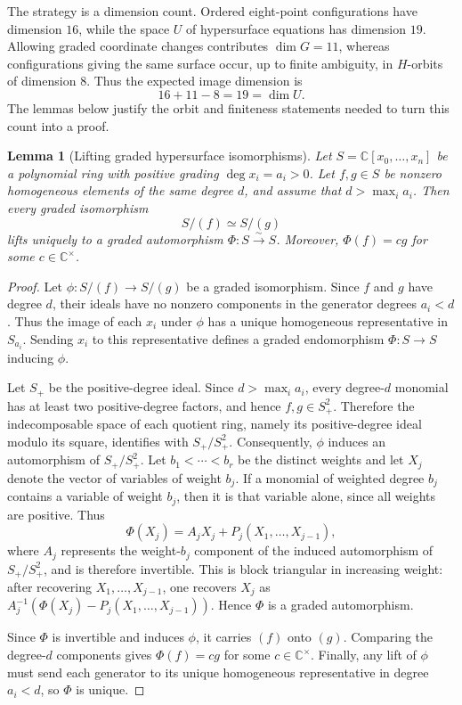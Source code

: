 \documentclass[11pt]{article}
\theoremstyle{plain}
\newtheorem{lemma}[lemma]{Lemma}
\theoremstyle{definition}
\theoremstyle{remark}
\newcommand{\C}{\mathbb C}
\begin{document}
The strategy is a dimension count. Ordered eight-point configurations have
dimension \(16\), while the space \(U\) of hypersurface equations has
dimension \(19\). Allowing graded coordinate changes contributes
\(\dim G=11\), whereas configurations giving the same surface occur, up to
finite ambiguity, in \(H\)-orbits of dimension \(8\). Thus the expected
image dimension is
\[
16+11-8=19=\dim U.
\]
The lemmas below justify the orbit and finiteness statements needed to turn
this count into a proof.

\begin{lemma}[Lifting graded hypersurface isomorphisms]
\label{lem:graded-ring-lift}
Let \(S=\C[x_0,\ldots,x_n]\) be a polynomial ring with positive grading
\(\deg x_i=a_i>0\). Let \(f,g\in S\) be nonzero homogeneous elements of
the same degree \(d\), and assume that \(d>\max_i a_i\). Then every graded
isomorphism
\[
S/(f)\simeq S/(g)
\]
lifts uniquely to a graded automorphism \(\Phi:S\xrightarrow{\sim}S\).
Moreover, \(\Phi(f)=cg\) for some \(c\in\C^\times\).
\end{lemma}

\begin{proof}
Let \(\phi:S/(f)\to S/(g)\) be a graded isomorphism. Since \(f\) and
\(g\) have degree \(d\), their ideals have no nonzero components in the
generator degrees \(a_i<d\). Thus the image of each \(x_i\) under \(\phi\)
has a unique homogeneous representative in \(S_{a_i}\). Sending \(x_i\) to
this representative defines a graded endomorphism \(\Phi:S\to S\) inducing
\(\phi\).

Let \(S_+\) be the positive-degree ideal. Since \(d>\max_i a_i\), every
degree-\(d\) monomial has at least two positive-degree factors, and hence
\(f,g\in S_+^2\). Therefore the indecomposable space of each quotient
ring, namely its positive-degree ideal modulo its square, identifies with
\(S_+/S_+^2\). Consequently, \(\phi\) induces an automorphism of
\(S_+/S_+^2\). Let \(b_1<\cdots<b_r\) be the distinct weights and let
\(X_j\) denote the vector of variables of weight \(b_j\). If a monomial of
weighted degree \(b_j\) contains a variable of weight \(b_j\), then it is
that variable alone, since all weights are positive. Thus
\[
\Phi(X_j)=A_jX_j+P_j(X_1,\ldots,X_{j-1}),
\]
where \(A_j\) represents the weight-\(b_j\) component of the induced
automorphism of \(S_+/S_+^2\), and is therefore invertible. This is block
triangular in increasing weight: after recovering \(X_1,\ldots,X_{j-1}\),
one recovers \(X_j\) as
\(A_j^{-1}(\Phi(X_j)-P_j(X_1,\ldots,X_{j-1}))\). Hence \(\Phi\) is a
graded automorphism.

Since \(\Phi\) is invertible and induces \(\phi\), it carries \((f)\) onto
\((g)\). Comparing the degree-\(d\) components gives \(\Phi(f)=cg\) for
some \(c\in\C^\times\). Finally, any lift of \(\phi\) must send each
generator to its unique homogeneous representative in degree \(a_i<d\),
so \(\Phi\) is unique.
\end{proof}
\end{document}
